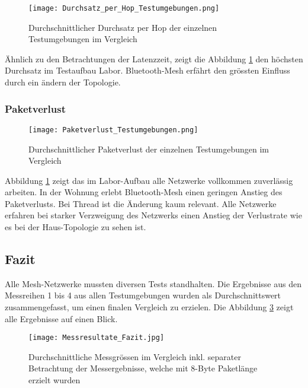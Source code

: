 \begin{figure}[H]
	\centering
	\texttt{[image: Durchsatz\_per\_Hop\_Testumgebungen.png]}
	\caption{Durchschnittlicher Durchsatz per Hop der einzelnen Testumgebungen im Vergleich}\label{fig:Durchsätze_per_Hop_Testumgebungen}
\end{figure}

Ähnlich zu den Betrachtungen der Latenzzeit, zeigt die Abbildung \ref{fig:Durchsätze_per_Hop_Testumgebungen} den höchsten Durchsatz im Testaufbau Labor. Bluetooth-Mesh erfährt den grössten Einfluss durch ein ändern der Topologie. 

\subsubsection{Paketverlust}\label{subsec:VergleichPaketverlustTestumgebungen}


\begin{figure}[H]
	\centering
	\texttt{[image: Paketverlust\_Testumgebungen.png]}
	\caption{Durchschnittlicher Paketverlust der einzelnen Testumgebungen im Vergleich}\label{fig:PaketverlusteTestumgebungen}
\end{figure}

Abbildung \ref{fig:Durchsätze_per_Hop_Testumgebungen} zeigt das im Labor-Aufbau alle Netzwerke vollkommen zuverlässig arbeiten. In der Wohnung erlebt Bluetooth-Mesh einen geringen Anstieg des Paketverlusts. Bei Thread ist die Änderung kaum relevant. Alle Netzwerke erfahren bei starker Verzweigung des Netzwerks einen Anstieg der Verlustrate wie es bei der Haus-Topologie zu sehen ist. 


\subsection{Fazit}\label{subsec:FazitVergleich}


Alle Mesh-Netzwerke mussten diversen Tests standhalten. Die Ergebnisse aus den Messreihen 1 bis 4 aus allen Testumgebungen wurden als Durchschnittswert zusammengefasst, um einen finalen Vergleich zu erzielen. Die Abbildung \ref{fig:Messresultate_Fazit} zeigt alle Ergebnisse auf einen Blick.

\begin{figure}[H]
	\centering
	\texttt{[image: Messresultate\_Fazit.jpg]}
	\caption{Durchschnittliche Messgrössen im Vergleich inkl. separater Betrachtung der Messergebnisse, welche mit 8-Byte Paketlänge erzielt wurden}\label{fig:Messresultate_Fazit}
\end{figure}

